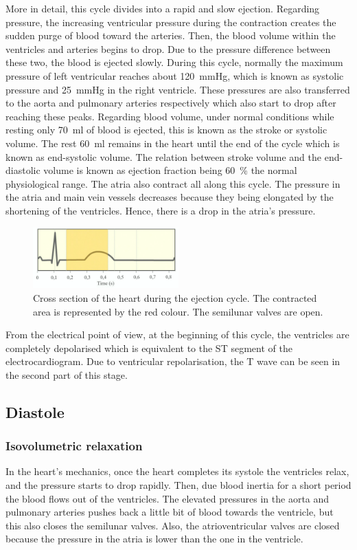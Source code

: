 More in detail, this cycle divides into a rapid and slow ejection. Regarding pressure, the increasing ventricular pressure during the contraction creates the sudden purge of blood toward the arteries. Then, the blood volume within the ventricles and arteries begins to drop. Due to the pressure difference between these two, the blood is ejected slowly. During this cycle, normally the maximum pressure of left ventricular reaches about \SI{120}{\mmHg}, which is known as systolic pressure and \SI{25}{\mmHg} in the right ventricle. These pressures are also transferred to the aorta and pulmonary arteries respectively which also start to drop after reaching these peaks. Regarding blood volume, under normal conditions while resting only \SI{70}{\milli\litre} of blood is ejected, this is known as the stroke or systolic volume. The rest \SI{60}{\milli\litre} remains in the heart until the end of the cycle which is known as end-systolic volume. The relation between stroke volume and the end-diastolic volume is known as ejection fraction being \SI{60}{\percent} the normal physiological range. The atria also contract all along this cycle. The pressure in the atria and main vein vessels decreases because they being elongated by the shortening of the ventricles. Hence, there is a drop in the atria's pressure. 

\begin{figure}[!htpb]
	\centering
	\includegraphics[width=0.5\textwidth,keepaspectratio]{figure_8}
	\caption[Heart's ejection]{Cross section of the heart during the ejection cycle. The contracted area is represented by the red colour. The semilunar valves are open.}
	\label{fig:ECG ejection}
\end{figure}

From the electrical point of view, at the beginning of this cycle, the ventricles are completely depolarised which is equivalent to the ST segment of the electrocardiogram. Due to ventricular repolarisation, the T wave can be seen in the second part of this stage. 

\subsection{Diastole}
\subsubsection{Isovolumetric relaxation}
In the heart's mechanics, once the heart completes its systole the ventricles relax, and the pressure starts to drop rapidly. Then, due blood inertia for a short period the blood flows out of the ventricles. The elevated pressures in the aorta and pulmonary arteries pushes back a little bit of blood towards the ventricle, but this also closes the semilunar valves. Also, the atrioventricular valves are closed because the pressure in the atria is lower than the one in the ventricle.

